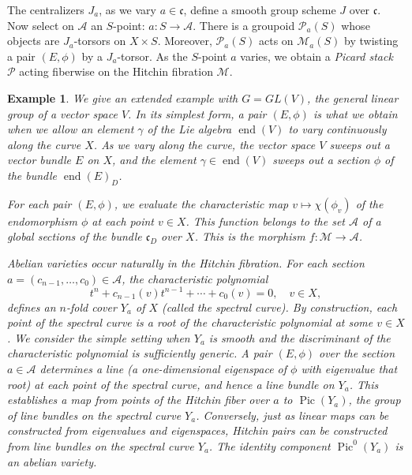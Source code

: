\documentclass[brochure,english,12pt]{bourbaki}
\theoremstyle{plain}
\newtheorem{example}[equation]{Example}
\def\op#1{{\operatorname{#1}}}
\def\cc{\mathfrak{c}}
\def\A{{\mathcal A}}
\def\M{{\mathcal M}}
\def\P{{\mathcal P}}
\begin{document}
The centralizers $J_a$, as we vary $a\in \cc$, define a smooth group
scheme $J$ over $\cc$.  Now select on $\A$ an $S$-point: $a:S\to\A$.
There is a groupoid $\P_a(S)$ whose objects are $J_a$-torsors on
$X\times S$.  Moreover, $\P_a(S)$ acts on $\M_a(S)$ by twisting a pair
$(E,\phi)$ by a $J_a$-torsor.  As the $S$-point $a$ varies, we obtain
a {\it Picard stack} $\P$ acting fiberwise on the Hitchin fibration $\M$.  

\begin{example} We give an extended example with $G=GL(V)$, the
  general linear group of a vector space $V$.  In its simplest form, a
  pair $(E,\phi)$ is what we obtain when we allow an element $\gamma$ of
  the Lie algebra $\op{end}(V)$ to vary continuously along the curve
  $X$.  As we vary along the curve, the vector space $V$ sweeps out a
  vector bundle $E$ on $X$, and the element $\gamma\in\op{end}(V)$ sweeps
  out a section $\phi$ of the bundle $\op{end}(E)_D$.

  For each pair $(E,\phi)$, we evaluate the characteristic map
  $v\mapsto \chi(\phi_v)$ of the endomorphism $\phi$ at each point
  $v\in X$. This function belongs to the set $\A$ of a global sections
  of the bundle $\cc_D$ over $X$.  This is the morphism $f:{\M}\to
  {\A}$.

  {\it Abelian varieties} occur naturally in the Hitchin fibration.
  For each section $a=(c_{n-1},\ldots,c_0)\in \A$, the characteristic
  polynomial
\begin{equation}\label{eqn:spectral}
t^n + c_{n-1}(v) t^{n-1} + \cdots+ c_0(v)=0,\quad v\in X,
\end{equation} 
defines an $n$-fold cover $Y_a$ of $X$ (called the {\it spectral
  curve}).  By construction, each point of the spectral curve is a
root of the characteristic polynomial at some $v\in X$.  We consider
the simple setting when $Y_a$ is smooth and the discriminant of the
characteristic polynomial is sufficiently generic.  A pair $(E,\phi)$
over the section $a\in\A$ determines a line (a one-dimensional eigenspace
of $\phi$ with eigenvalue that root) at each point of the spectral
curve, and hence a line bundle on $Y_a$.  This establishes a map from
points of the Hitchin fiber over $a$ to $\op{Pic}(Y_a)$, the group of
line bundles on the spectral curve $Y_a$.  Conversely, just as linear
maps can be constructed from eigenvalues and eigenspaces, Hitchin
pairs can be constructed from line bundles on the spectral curve
$Y_a$.  The identity component $\op{Pic}^0(Y_a)$ is an abelian
variety.
\end{example}
\end{document}
